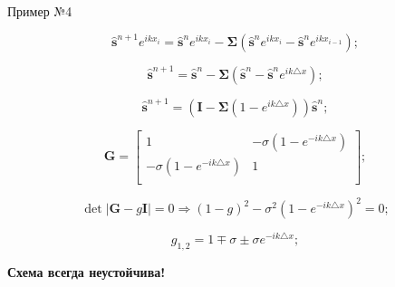 \documentclass[10pt,xcolor=pst,aspectratio=169]{beamer}
\begin{document}
\begin{frame}{Пример №4}

    \transdissolve[duration=0.1]
    \justifying
    \large

    \[
        \hat{\mathbf{s}}^{n + 1} e^{i k x_{i}}
        =
        \hat{\mathbf{s}}^{n} e^{i k x_{i}} - \bm{\Sigma} \left( \hat{\mathbf{s}}^{n} e^{i k x_{i}} - \hat{\mathbf{s}}^{n} e^{i k x_{i - 1}} \right);
    \]

    \[
        \hat{\mathbf{s}}^{n + 1}
        =
        \hat{\mathbf{s}}^{n} - \bm{\Sigma} \left( \hat{\mathbf{s}}^{n} - \hat{\mathbf{s}}^{n} e^{i k \triangle x} \right);
    \]

    \[
        \hat{\mathbf{s}}^{n + 1}
        =
        \boxed{\left( \mathbf{I} - \bm{\Sigma} \left( 1 - e^{i k \triangle x} \right) \right)} \hat{\mathbf{s}}^{n};
    \]



%

    \[
        \mathbf{G}
        =
        \begin{bmatrix}
           1 & -\sigma \left( 1 - e^{-i k \triangle x} \right) \\
           -\sigma \left( 1 - e^{-i k \triangle x} \right) & 1 \\
        \end{bmatrix};
    \]

    \[
        \det \left| \mathbf{G} - g \mathbf{I} \right| = 0
        \Rightarrow
        \left( 1 - g \right)^{2} - \sigma^{2} \left( 1 - e^{-i k \triangle x} \right)^{2} = 0;
    \]

    \[
        g_{1,2} = 1 \mp \sigma \pm \sigma e^{-i k \triangle x};
    \]

    \begin{center}
        \textbf{Схема всегда неустойчива!}
    \end{center}

\end{frame}
\end{document}
